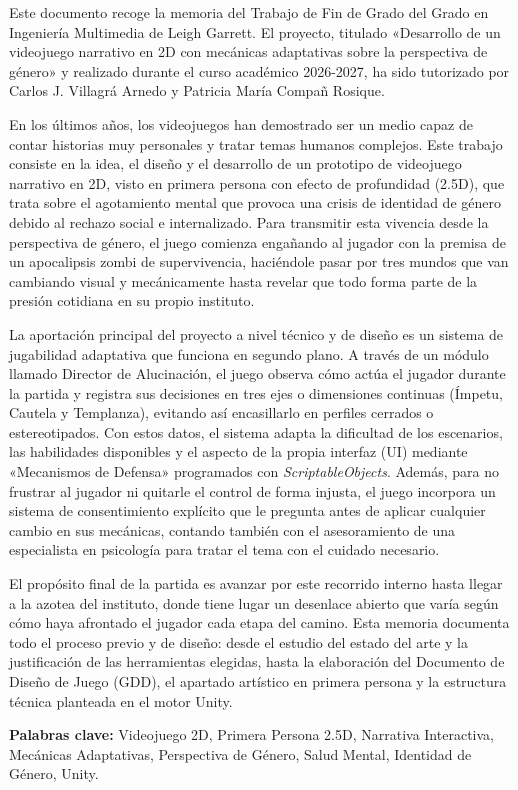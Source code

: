 
Este documento recoge la memoria del Trabajo de Fin de Grado del Grado en Ingeniería Multimedia de Leigh Garrett. El proyecto, titulado «Desarrollo de un videojuego narrativo en 2D con mecánicas adaptativas sobre la perspectiva de género» y realizado durante el curso académico 2026-2027, ha sido tutorizado por Carlos J. Villagrá Arnedo y Patricia María Compañ Rosique.

En los últimos años, los videojuegos han demostrado ser un medio capaz de contar historias muy personales y tratar temas humanos complejos. Este trabajo consiste en la idea, el diseño y el desarrollo de un prototipo de videojuego narrativo en \ac{2D}, visto en primera persona con efecto de profundidad (2.5D), que trata sobre el agotamiento mental que provoca una crisis de identidad de género debido al rechazo social e internalizado. Para transmitir esta vivencia desde la perspectiva de género, el juego comienza engañando al jugador con la premisa de un apocalipsis zombi de supervivencia, haciéndole pasar por tres mundos que van cambiando visual y mecánicamente hasta revelar que todo forma parte de la presión cotidiana en su propio instituto.

La aportación principal del proyecto a nivel técnico y de diseño es un sistema de jugabilidad adaptativa que funciona en segundo plano. A través de un módulo llamado Director de Alucinación, el juego observa cómo actúa el jugador durante la partida y registra sus decisiones en tres ejes o dimensiones continuas (Ímpetu, Cautela y Templanza), evitando así encasillarlo en perfiles cerrados o estereotipados. Con estos datos, el sistema adapta la dificultad de los escenarios, las habilidades disponibles y el aspecto de la propia interfaz (\ac{UI}) mediante «Mecanismos de Defensa» programados con \textit{ScriptableObjects}. Además, para no frustrar al jugador ni quitarle el control de forma injusta, el juego incorpora un sistema de consentimiento explícito que le pregunta antes de aplicar cualquier cambio en sus mecánicas, contando también con el asesoramiento de una especialista en psicología para tratar el tema con el cuidado necesario.

El propósito final de la partida es avanzar por este recorrido interno hasta llegar a la azotea del instituto, donde tiene lugar un desenlace abierto que varía según cómo haya afrontado el jugador cada etapa del camino. Esta memoria documenta todo el proceso previo y de diseño: desde el estudio del estado del arte y la justificación de las herramientas elegidas, hasta la elaboración del Documento de Diseño de Juego (\ac{GDD}), el apartado artístico en primera persona y la estructura técnica planteada en el motor Unity.

\vspace{1em}
\noindent\textbf{Palabras clave:} Videojuego 2D, Primera Persona 2.5D, Narrativa Interactiva, Mecánicas Adaptativas, Perspectiva de Género, Salud Mental, Identidad de Género, Unity.